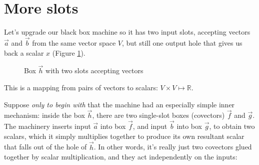 \section{More slots}

Let's upgrade our black box machine so it has two input slots, accepting vectors $\vec{a}$ and $\vec{b}$ from the same vector space $V$, but still one output hole that gives us back a scalar $x$ (Figure \ref{fig:2-slot-box}).

\begin{figure}[h]
    \centering
    \caption{Box $\vec{h}$ with two slots accepting vectors} \label{fig:2-slot-box}
\end{figure}

This is a mapping from pairs of vectors to scalars: $V \times V \mapsto \mathbb{R}$.

Suppose \textit{only to begin with} that the machine had an especially simple inner mechanism: inside the box $\vec{h}$, there are two single-slot boxes (covectors) $\vec{f}$ and $\vec{g}$. The machinery inserts input $\vec{a}$ into box $\vec{f}$, and input $\vec{b}$ into box $\vec{g}$, to obtain two scalars, which it simply multiplies together to produce its own resultant scalar that falls out of the hole of $\vec{h}$. In other words, it's really just two covectors glued together by scalar multiplication, and they act independently on the inputs:

